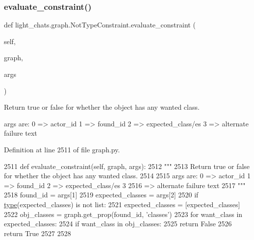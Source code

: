 \subsubsection{\texorpdfstring{evaluate\+\_\+constraint()}{evaluate\_constraint()}}
{\footnotesize\ttfamily def light\+\_\+chats.\+graph.\+Not\+Type\+Constraint.\+evaluate\+\_\+constraint (\begin{DoxyParamCaption}\item[{}]{self,  }\item[{}]{graph,  }\item[{}]{args }\end{DoxyParamCaption})}

\begin{DoxyVerb}Return true or false for whether the object has any wanted class.

args are:     0 => actor_id     1 => found_id     2 => expected_class/es     3
=> alternate failure text
\end{DoxyVerb}
 

Definition at line 2511 of file graph.\+py.


\begin{DoxyCode}
2511     \textcolor{keyword}{def }evaluate\_constraint(self, graph, args):
2512         \textcolor{stringliteral}{"""}
2513 \textcolor{stringliteral}{        Return true or false for whether the object has any wanted class.}
2514 \textcolor{stringliteral}{}
2515 \textcolor{stringliteral}{        args are:     0 => actor\_id     1 => found\_id     2 => expected\_class/es     3}
2516 \textcolor{stringliteral}{        => alternate failure text}
2517 \textcolor{stringliteral}{        """}
2518         found\_id = args[1]
2519         expected\_classes = args[2]
2520         \textcolor{keywordflow}{if} \hyperlink{namespaceparlai_1_1agents_1_1tfidf__retriever_1_1build__tfidf_ad5dfae268e23f506da084a9efb72f619}{type}(expected\_classes) \textcolor{keywordflow}{is} \textcolor{keywordflow}{not} list:
2521             expected\_classes = [expected\_classes]
2522         obj\_classes = graph.get\_prop(found\_id, \textcolor{stringliteral}{'classes'})
2523         \textcolor{keywordflow}{for} want\_class \textcolor{keywordflow}{in} expected\_classes:
2524             \textcolor{keywordflow}{if} want\_class \textcolor{keywordflow}{in} obj\_classes:
2525                 \textcolor{keywordflow}{return} \textcolor{keyword}{False}
2526         \textcolor{keywordflow}{return} \textcolor{keyword}{True}
2527 
2528 
\end{DoxyCode}
\mbox{\label{classlight__chats_1_1graph_1_1NotTypeConstraint_a5676df24e75c1823bd7b555a266de5f3}} 
